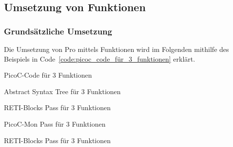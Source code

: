 
\subsection{Umsetzung von Funktionen}
\subsubsection{Grundsätzliche Umsetzung}

Die Umsetzung von Pro mittels Funktionen wird im Folgenden mithilfe des Beispiels in Code~\ref{code:picoc_code_für_3_funktionen} erklärt.

\begin{code}
  \centering
  \caption{PicoC-Code für 3 Funktionen}
  \label{code:picoc_code_für_3_funktionen}
\end{code}

\begin{code}
  \centering
  \caption{Abstract Syntax Tree für 3 Funktionen}
  \label{code:abstract_syntax_tree_für_3_Funktionen}
\end{code}

\begin{code}
  \centering
  \caption{RETI-Blocks Pass für 3 Funktionen}
  \label{code:picoc_blocks_pass_für_3_Funktionen}
\end{code}

\begin{code}
  \centering
  \caption{PicoC-Mon Pass für 3 Funktionen}
  \label{code:picoc_mon_pass_für_3_Funktionen}
\end{code}

\begin{code}
  \centering
  \caption{RETI-Blocks Pass für 3 Funktionen}
  \label{code:reti_blocks_pass_für_3_Funktionen}
\end{code}


